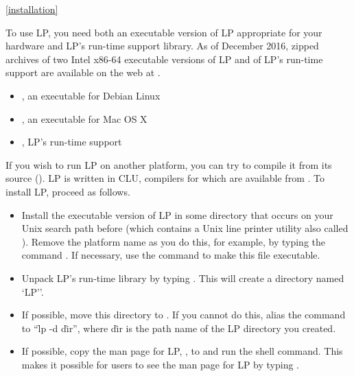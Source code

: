 \ref{installation}

To use LP, you need both an executable version of LP appropriate for your
hardware and LP's run-time support library.  As of December 2016, zipped
archives of two Intel x86-64 executable versions of LP and of LP's run-time
support are available on the web at .
\begin{itemize}
\item
{}, an executable for Debian Linux
\item
{}, an executable for Mac OS X
\item
{}, LP's run-time support
\end{itemize}

If you wish to run LP on another platform, you can try to compile it from its
source ().  LP is written in CLU, compilers for which are
available from .
\p
To install LP, proceed as follows.

\begin{itemize}
\item
Install the executable version of LP in some directory that occurs on your Unix
search path before  (which contains a Unix line printer utility
also called ).  Remove the platform name as you do this, for example, by
typing the command .  If necessary, use the
 command to make this file executable.
\p
\item
Unpack LP's run-time library by typing .  This will
create a directory named `LP''.
\p
\item
If possible, move this directory to .  If you cannot
do this, alias the command  to ``\f{lp -d} \v{dir}'', where \v{dir} is
the path name of the LP directory you created.
\p
\item
If possible, copy the man page for LP, , to
 and run the  shell command.  This makes it
possible for users to see the man page for LP by typing .
\end{itemize}
